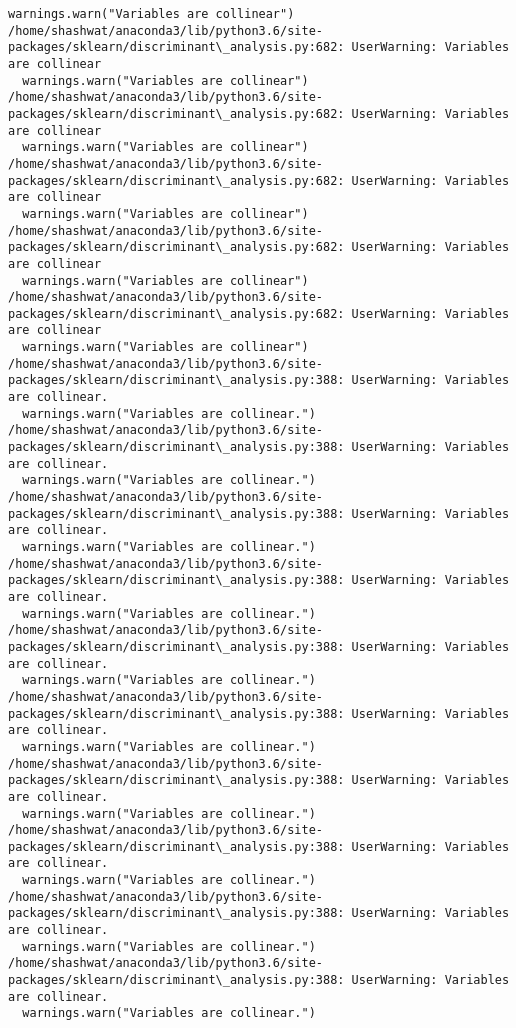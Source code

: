 \documentclass[11pt]{article}
\begin{document}
\begin{Verbatim}[commandchars=\\\{\}]
  warnings.warn("Variables are collinear")
/home/shashwat/anaconda3/lib/python3.6/site-packages/sklearn/discriminant\_analysis.py:682: UserWarning: Variables are collinear
  warnings.warn("Variables are collinear")
/home/shashwat/anaconda3/lib/python3.6/site-packages/sklearn/discriminant\_analysis.py:682: UserWarning: Variables are collinear
  warnings.warn("Variables are collinear")
/home/shashwat/anaconda3/lib/python3.6/site-packages/sklearn/discriminant\_analysis.py:682: UserWarning: Variables are collinear
  warnings.warn("Variables are collinear")
/home/shashwat/anaconda3/lib/python3.6/site-packages/sklearn/discriminant\_analysis.py:682: UserWarning: Variables are collinear
  warnings.warn("Variables are collinear")
/home/shashwat/anaconda3/lib/python3.6/site-packages/sklearn/discriminant\_analysis.py:682: UserWarning: Variables are collinear
  warnings.warn("Variables are collinear")
/home/shashwat/anaconda3/lib/python3.6/site-packages/sklearn/discriminant\_analysis.py:388: UserWarning: Variables are collinear.
  warnings.warn("Variables are collinear.")
/home/shashwat/anaconda3/lib/python3.6/site-packages/sklearn/discriminant\_analysis.py:388: UserWarning: Variables are collinear.
  warnings.warn("Variables are collinear.")
/home/shashwat/anaconda3/lib/python3.6/site-packages/sklearn/discriminant\_analysis.py:388: UserWarning: Variables are collinear.
  warnings.warn("Variables are collinear.")
/home/shashwat/anaconda3/lib/python3.6/site-packages/sklearn/discriminant\_analysis.py:388: UserWarning: Variables are collinear.
  warnings.warn("Variables are collinear.")
/home/shashwat/anaconda3/lib/python3.6/site-packages/sklearn/discriminant\_analysis.py:388: UserWarning: Variables are collinear.
  warnings.warn("Variables are collinear.")
/home/shashwat/anaconda3/lib/python3.6/site-packages/sklearn/discriminant\_analysis.py:388: UserWarning: Variables are collinear.
  warnings.warn("Variables are collinear.")
/home/shashwat/anaconda3/lib/python3.6/site-packages/sklearn/discriminant\_analysis.py:388: UserWarning: Variables are collinear.
  warnings.warn("Variables are collinear.")
/home/shashwat/anaconda3/lib/python3.6/site-packages/sklearn/discriminant\_analysis.py:388: UserWarning: Variables are collinear.
  warnings.warn("Variables are collinear.")
/home/shashwat/anaconda3/lib/python3.6/site-packages/sklearn/discriminant\_analysis.py:388: UserWarning: Variables are collinear.
  warnings.warn("Variables are collinear.")
/home/shashwat/anaconda3/lib/python3.6/site-packages/sklearn/discriminant\_analysis.py:388: UserWarning: Variables are collinear.
  warnings.warn("Variables are collinear.")

    \end{Verbatim}
\end{document}
